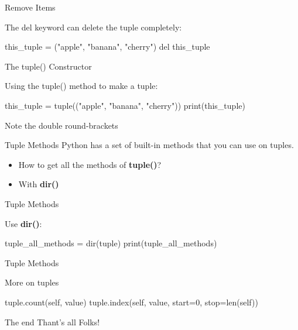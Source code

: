 \documentclass[hyperref={pdfpagelabels=false}]{beamer}
\begin{document}
\begin{frame}[fragile]{Remove Items}
\begin{exampleblock}{The del keyword can delete the tuple completely:}
\begin{python3}
this_tuple = ("apple", "banana", "cherry")
del this_tuple
\end{python3}
\end{exampleblock}
\end{frame}

\begin{frame}[fragile]{The tuple() Constructor}
\begin{exampleblock}{Using the tuple() method to make a tuple:}
\begin{python3}
this_tuple = tuple(("apple", "banana", "cherry"))
print(this_tuple)
\end{python3}
\end{exampleblock}

Note the double round-brackets
\end{frame}

\begin{frame}[fragile]{Tuple Methods}
Python has a set of built-in methods that you can use on tuples.
\begin{itemize}[<+->]
\item How to get all the methods of \textbf{tuple()}?
\item With \textbf{dir()}
\end{itemize}

\end{frame}

\begin{frame}[fragile]{Tuple Methods}
\begin{exampleblock}{Use \textbf{dir()}:}
\begin{python3}
tuple_all_methods = dir(tuple)
print(tuple_all_methods)
\end{python3}
\end{exampleblock}
\end{frame}

\begin{frame}[fragile]{Tuple Methods}
\begin{exampleblock}{More on tuples}
\begin{python3}
tuple.count(self, value)
tuple.index(self, value, start=0, stop=len(self))
\end{python3}
\end{exampleblock}
\end{frame}

\begin{frame}{The end}
\centering
\Large{Thant's all Folks!}
\end{frame}
\end{document}
